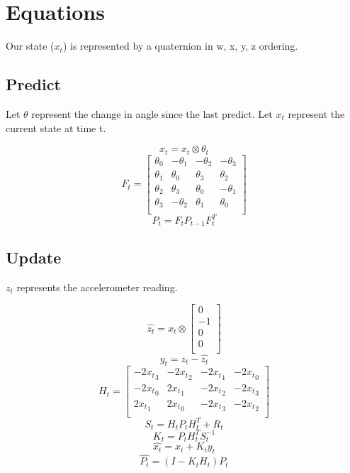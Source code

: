 \documentclass{article}
\begin{document}
    \section{Equations}

    Our state ($x_t$) is represented by a quaternion in w, x, y, z ordering.

    \subsection{Predict}
    Let $\theta$ represent the change in angle since the last predict.
    Let $x_t$ represent the current state at time t.

    $$x_t = x_t \otimes \theta_t $$
    $$F_t = \begin{bmatrix}
                \theta_0 & -\theta_1 & -\theta_2 & -\theta_3 \\
                \theta_1 & \theta_0 & \theta_3 & \theta_2 \\
                \theta_2 & \theta_3 & \theta_0 & -\theta_1 \\
                \theta_3 & -\theta_2 & \theta_1 & \theta_0 \\
    \end{bmatrix}$$
    $$P_t = F_tP_{t-1}F^T_t$$

    \subsection{Update}
    $z_t$ represents the accelerometer reading.


    $$\hat{z_t} = x_t \otimes \begin{bmatrix} 0 \\ -1 \\ 0 \\ 0 \\ \end{bmatrix}$$
    $$y_t = z_t - \hat{z_t}$$
    $$H_t = \begin{bmatrix}
                -2{x_t}_3 & -2{x_t}_2 & -2{x_t}_1 & -2{x_t}_0 \\
                -2{x_t}_0 & 2{x_t}_1 & -2{x_t}_2 & -2{x_t}_3 \\
                2{x_t}_1 & 2{x_t}_0 & -2{x_t}_3 & -2{x_t}_2 \\
    \end{bmatrix}$$
    $$S_t = H_t P_tH^T_t + R_t$$
    $$K_t = P_tH^T_t S^{-1}_t$$
    $$\hat{x_t} = x_t + K_ty_t$$
    $$\hat{P_t} = (I - K_tH_t)P_t$$
\end{document}
